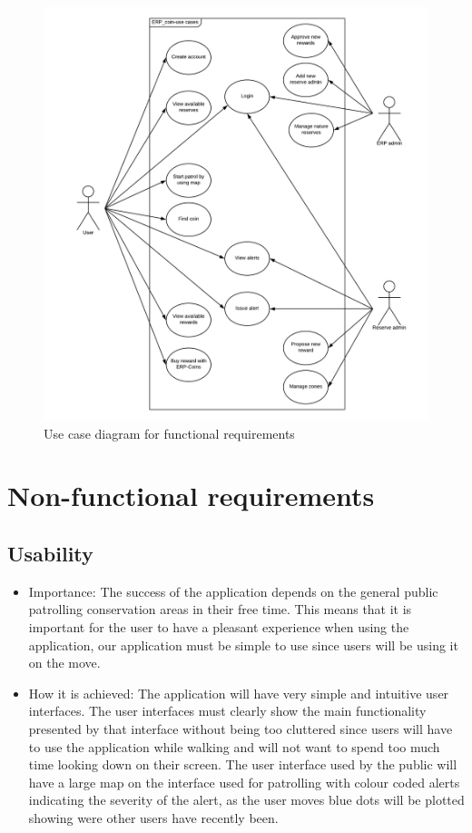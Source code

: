 \documentclass{article}
\begin{document}
\begin{figure}[h]
\centering
\includegraphics[scale=0.5]{UseCase.png}
\caption{Use case diagram for functional requirements}
\end{figure}

\section{Non-functional requirements}
\subsection{Usability}
\begin{itemize}
\item Importance: The success of the application depends on the general public patrolling conservation areas in their free time. This means that it is important for the user to have a pleasant experience when using the application, our application must be simple to use since users will be using it on the move. 
\item How it is achieved: The application will have very simple and intuitive user interfaces. The user interfaces must clearly show the main functionality presented by that interface without being too cluttered since users will have to use the application while walking and will not want to spend too much time looking down on their screen. The user interface used by the public will have a large map on the interface used for patrolling with colour coded alerts indicating the severity of the alert, as the user moves blue dots will be plotted showing were other users have recently been.
\end{itemize}
\end{document}
